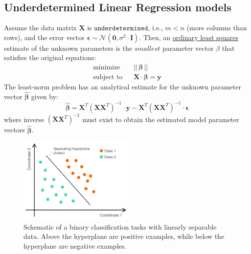 \documentclass{article}[12pt]
\begin{document}
\subsection{Underdetermined Linear Regression models}
Assume the data matrix $\mathbf{X}$ is $\texttt{underdetermined}$, i.e., $m < n$ (more columns than rows), and 
the error vector $\mathbf{\epsilon}\sim\mathcal{N}(\mathbf{0},\sigma^{2}\cdot\mathbf{I})$.
Then, an \href{https://en.wikipedia.org/wiki/Ordinary_least_squares}{ordinary least squares} estimate of the unknown parameters is the $\textit{smallest}$ parameter vector $\beta$ that satisfies the original equations:
\begin{eqnarray*}
\text{minimize}~& & ||\,\mathbf{\beta}\,|| \\
\text{subject to} & & \mathbf{X}\cdot\mathbf{\beta} = \mathbf{y}
\end{eqnarray*}
The least-norm problem has an analytical estimate for the unknown parameter vector $\hat{\mathbf{\beta}}$ given by:
\begin{equation*}
\hat{\mathbf{\beta}} =\mathbf{X}^{T}\left(\mathbf{X}\mathbf{X}^{T}\right)^{-1}\cdot\mathbf{y} - \mathbf{X}^{T}\left(\mathbf{X}\mathbf{X}^{T}\right)^{-1}\cdot\mathbf{\epsilon}
\end{equation*}
where inverse $\left(\mathbf{X}\mathbf{X}^{T}\right)^{-1}$ must exist to obtain the estimated model parameter vectors $\hat{\mathbf{\beta}}$.

\begin{figure}
    \centering
	\includegraphics[width=0.5\textwidth]{./figs/Fig-LinearSeperableData-Hyperplane.pdf}
	\caption{Schematic of a binary classification tasks with linearly separable data.
    Above the hyperplane are positive examples, while below the hyperplane are negative examples.}\label{fig:linearhyperplane}
\end{figure}
\end{document}
